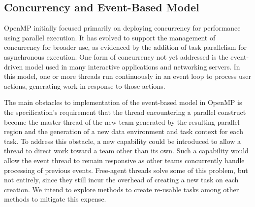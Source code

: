 \subsection{Concurrency and Event-Based Model}
\label{sub:concurrency_and_event_based_model}


OpenMP initially focused primarily on deploying concurrency for performance
using parallel execution. It has evolved to support the management of
concurrency for broader use, as evidenced by the addition of task parallelism
for asynchronous execution.  One form of concurrency not yet addressed is the
event-driven model used in many interactive applications and networking servers.
In this model, one or more threads run continuously in an event loop to process
user actions, generating work in response to those actions.  
 
The main obstacles to implementation of the event-based model in 
OpenMP is the specification's requirement that the thread 
encountering a parallel construct become the master thread of 
the new team generated by the resulting parallel region and the generation of a
new data environment and task context for each task.  To 
address this obstacle, a new capability could be introduced to 
allow a thread to direct work toward a team other than its own. 
Such a capability would allow the event thread to remain 
responsive as other teams concurrently handle processing of 
previous events.  Free-agent threads solve some of this problem, but not
entirely, since they still incur the overhead of creating a new task on each
creation.  We intend to explore methods to create re-usable tasks among other
methods to mitigate this expense.


